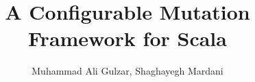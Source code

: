 \documentclass[preprint]{sig-alternate}
\begin{document}
\setlength{\pdfpageheight}{\paperheight}
\setlength{\pdfpagewidth}{\paperwidth}



\title{A Configurable Mutation Framework for Scala}

%
\author{
%
%
\alignauthor
 Muhammad Ali Gulzar, Shaghayegh Mardani \\
 \vspace{5mm}
 \\
}

\maketitle
\end{document}
